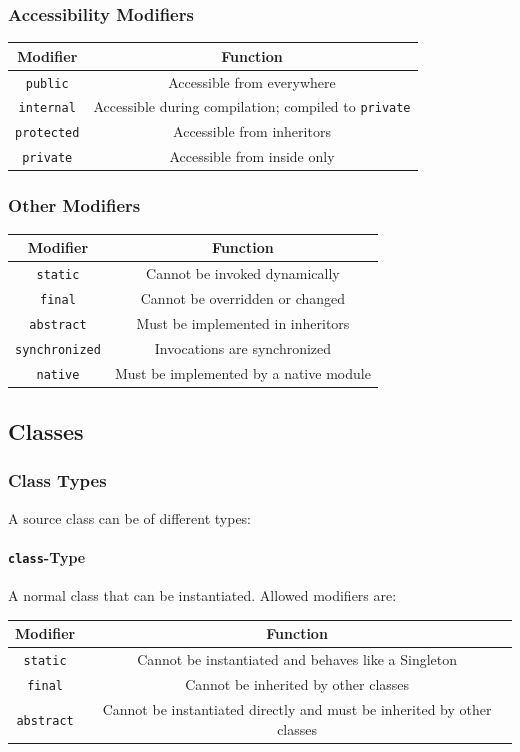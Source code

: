 \documentclass{docs}
\begin{document}
    \subsubsection{Accessibility Modifiers}
    \begin{center}
    \begin{tabular}{c|c}
        Modifier & Function \\
        \hline
        \texttt{public} & Accessible from everywhere \\
        \texttt{internal} & Accessible during compilation; compiled to \texttt{private} \\
        \texttt{protected} & Accessible from inheritors \\
        \texttt{private} & Accessible from inside only
    \end{tabular}
    \end{center}
    \subsubsection{Other Modifiers}
    \begin{center}
    \begin{tabular}{c|c}
        Modifier & Function \\
        \hline
        \texttt{static} & Cannot be invoked dynamically \\
        \texttt{final} & Cannot be overridden or changed \\
        \texttt{abstract} & Must be implemented in inheritors \\
        \texttt{synchronized} & Invocations are synchronized \\
        \texttt{native} & Must be implemented by a native module
    \end{tabular}
    \end{center}
    \subsection{Classes}
    \subsubsection{Class Types}
    A source class can be of different types:
    \paragraph{\texttt{class}-Type}
    A normal class that can be instantiated.
    Allowed modifiers are:
    \begin{center}
    \begin{tabular}{c|c}
        Modifier & Function \\
        \hline
        \texttt{static} & Cannot be instantiated and behaves like a Singleton \\
        \texttt{final} & Cannot be inherited by other classes \\
        \texttt{abstract} & Cannot be instantiated directly and must be inherited by other classes
    \end{tabular}
    \end{center}
\end{document}

